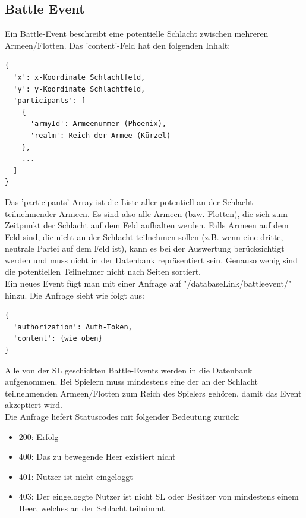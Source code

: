 \documentclass[11pt,a4paper,twocolumn]{article}
\begin{document}
\subsection{Battle Event}\label{ss:events_battle}
Ein Battle-Event beschreibt eine potentielle Schlacht zwischen mehreren Armeen/Flotten. Das 'content'-Feld hat den folgenden Inhalt:
\begin{lstlisting}
{
  'x': x-Koordinate Schlachtfeld,
  'y': y-Koordinate Schlachtfeld,
  'participants': [
    {
      'armyId': Armeenummer (Phoenix),
      'realm': Reich der Armee (Kürzel)
    },
    ...
  ]
}
\end{lstlisting}
Das 'participants'-Array ist die Liste aller potentiell an der Schlacht teilnehmender Armeen. Es sind also alle Armeen (bzw. Flotten), die sich zum Zeitpunkt der Schlacht auf dem Feld aufhalten werden. Falls Armeen auf dem Feld sind, die nicht an der Schlacht teilnehmen sollen (z.B. wenn eine dritte, neutrale Partei auf dem Feld ist), kann es bei der Auswertung berücksichtigt werden und muss nicht in der Datenbank repräsentiert sein. Genauso wenig sind die potentiellen Teilnehmer nicht nach Seiten sortiert.\\
Ein neues Event fügt man mit einer Anfrage auf "/databaseLink/battleevent/" hinzu.  Die Anfrage sieht wie folgt aus:
\begin{lstlisting}
{
  'authorization': Auth-Token,
  'content': {wie oben}
}
\end{lstlisting}
Alle von der SL geschickten Battle-Events werden in die Datenbank aufgenommen. Bei Spielern muss mindestens eine der an der Schlacht teilnehmenden Armeen/Flotten zum Reich des Spielers gehören, damit das Event akzeptiert wird.\\
Die Anfrage liefert Statuscodes mit folgender Bedeutung zurück:
\begin{itemize}
\item 200: Erfolg
\item 400: Das zu bewegende Heer existiert nicht
\item 401: Nutzer ist nicht eingeloggt
\item 403: Der eingeloggte Nutzer ist nicht SL oder Besitzer von mindestens einem Heer, welches an der Schlacht teilnimmt
\end{itemize}
\end{document}
